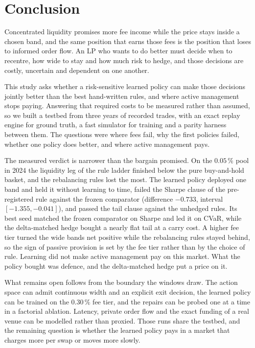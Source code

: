 \section{Conclusion}
\label{sec:conclusion}

Concentrated liquidity promises more fee income while the price stays inside a
chosen band, and the same position that earns those fees is the position that
loses to informed order flow. An LP who wants to do better must decide when to
recentre, how wide to stay and how much risk to hedge, and those decisions are
costly, uncertain and dependent on one another.

This study asks whether a risk-sensitive learned policy can make those
decisions jointly better than the best hand-written rules, and where active
management stops paying. Answering that required costs to be measured rather
than assumed, so we built a testbed from three years of recorded trades, with
an exact replay engine for ground truth, a fast simulator for training and a
parity harness between them. The questions were where fees fail, why the first
policies failed, whether one policy does better, and where active management
pays.

The measured verdict is narrower than the bargain promised. On the
$0.05\,\%$ pool in 2024 the liquidity leg of the rule ladder finished below
the pure buy-and-hold basket, and the rebalancing rules lost the most. The
learned policy deployed one band and held it without learning to time, failed
the Sharpe clause of the pre-registered rule against the frozen comparator
(difference $-0.733$, interval $[-1.355,-0.041]$), and passed the tail clause
against the unhedged rules. Its best seed matched the frozen comparator on
Sharpe and led it on CVaR, while the delta-matched hedge bought a nearly flat
tail at a carry cost. A higher fee tier turned the wide bands net positive
while the rebalancing rules stayed behind, so the sign of passive provision is
set by the fee tier rather than by the choice of rule. Learning did not make
active management pay on this market. What the policy bought was defence, and
the delta-matched hedge put a price on it.

What remains open follows from the boundary the windows draw. The action space
can admit continuous width and an explicit exit decision, the learned policy
can be trained on the $0.30\,\%$ fee tier, and the repairs can be probed one
at a time in a factorial ablation. Latency, private order flow and the exact
funding of a real venue can be modelled rather than proxied. Those runs share
the testbed, and the remaining question is whether the learned policy pays in
a market that charges more per swap or moves more slowly.
